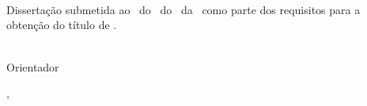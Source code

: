 
\begin{titlepage}
\begin{center}
  \begin{espacosimples}

    {
      \fontsize{14}{16}
      \selectfont 
      \bfseries
     
      \instituicaoformat

      \instituicaoA\\
      \centro\\
      \departamento\\
      \programa
      
    }
    
    \vfill

    {
      \fontsize{18}{22}
      \selectfont
      \bfseries
      
      \tituloA
      
    }
    
    \vfill

    {
      \fontsize{14}{16}
      \selectfont
      \bfseries 
      
      \autorA
      
    }

    \vfill

    \begin{flushright}

      \parbox{8cm}{

	{
	  \fontsize{10}{12}
	  \selectfont
   
	  Dissertação   submetida   ao   \programa\  do   \departamento\   do
          \centro\ da \instituicaoA\ como  parte dos requisitos para a
          obtenção do título de \grau.

	}
      }
    \end{flushright}

    \vfill

    {
      \fontsize{14}{16}
      \selectfont
      
      \orientadorA\\Orientador
      
    }

    \vfill

    {
      \fontsize{12}{14}
      \selectfont
      
      \localA, \dataA

    }

  \end{espacosimples}

\end{center}

\end{titlepage}
